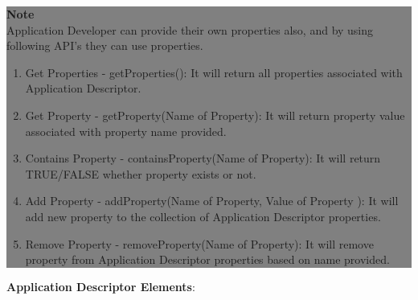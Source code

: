 			\begin{center}
				\colorbox{grey}{
					\parbox[t]{.8\linewidth}{
						\fontsize{11pt}{11pt}\selectfont %
						\vspace*{0.1cm} %
		
						\hfill \textbf{Note} \\

			
						Application Developer can provide their own properties also, and by using following API's they can use properties.

						\hfill 	
						\begin{enumerate}
							\item \small Get Properties - getProperties(): It will return all properties associated with Application Descriptor.
							\item \small Get Property - getProperty(Name of Property): It will return property value associated with property name provided.
							\item \small Contains Property - containsProperty(Name of Property): It will return TRUE/FALSE whether property exists or not.
							\item \small Add Property - addProperty(Name of Property, Value of Property ): It will add new property to the  collection of Application Descriptor properties.
							\item \small Remove Property - removeProperty(Name of Property): It will remove property from Application Descriptor properties based on name provided.
						\end{enumerate}

						\vspace*{0.0cm} %
				}
			}

		\end{center}


\textbf{Application Descriptor Elements}: 

